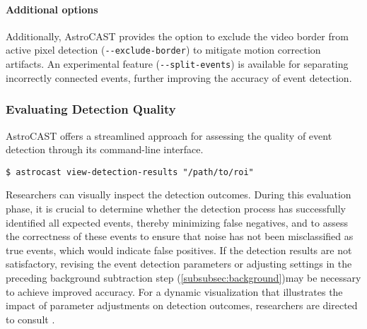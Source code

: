 \paragraph{Additional options}
Additionally, AstroCAST provides the option to exclude the video border from active pixel detection (\lstinline[style=bashStyle]{--exclude-border}) to mitigate motion correction artifacts. An experimental feature (\lstinline[style=bashStyle]{--split-events}) is available for separating incorrectly connected events, further improving the accuracy of event detection.


\subsubsection{Evaluating Detection Quality}
AstroCAST offers a streamlined approach for assessing the quality of event detection through its command-line interface.

\begin{lstlisting}[style=bashStyle]
    $ astrocast view-detection-results "/path/to/roi"
\end{lstlisting}

Researchers can visually inspect the detection outcomes. During this evaluation phase, it is crucial to determine whether the detection process has successfully identified all expected events, thereby minimizing false negatives, and to assess the correctness of these events to ensure that noise has not been misclassified as true events, which would indicate false positives. If the detection results are not satisfactory, revising the event detection parameters or adjusting settings in the preceding background subtraction step (\ref{subsubsec:background})may be necessary to achieve improved accuracy. For a dynamic visualization that illustrates the impact of parameter adjustments on detection outcomes, researchers are directed to consult .

